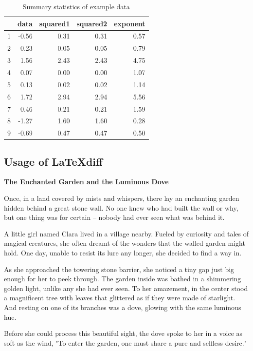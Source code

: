 \documentclass[10pt, fullpage, a4paper, titlepage]{article}
\begin{document}
\begin{table}[ht]
\centering
\caption{Summary statistics of example data}
\label{tab:example}
\begin{tabular}{rrrrr}
  \hline
 & data & squared1 & squared2 & exponent \\ 
  \hline
1 & -0.56 & 0.31 & 0.31 & 0.57 \\ 
2 & -0.23 & 0.05 & 0.05 & 0.79 \\ 
3 & 1.56 & 2.43 & 2.43 & 4.75 \\ 
4 & 0.07 & 0.00 & 0.00 & 1.07 \\ 
5 & 0.13 & 0.02 & 0.02 & 1.14 \\ 
6 & 1.72 & 2.94 & 2.94 & 5.56 \\ 
7 & 0.46 & 0.21 & 0.21 & 1.59 \\ 
8 & -1.27 & 1.60 & 1.60 & 0.28 \\ 
9 & -0.69 & 0.47 & 0.47 & 0.50 \\ 
   \hline
\end{tabular}
\end{table}

\subsection{Usage of LaTeXdiff}

\textbf{The Enchanted Garden and the Luminous Dove}

Once, in a land covered by mists and whispers, there lay an enchanting garden hidden behind a great stone wall. No one knew who had built the wall or why, but one thing was for certain – nobody had ever seen what was behind it.

A little girl named Clara lived in a village nearby. Fueled by curiosity and tales of magical creatures, she often dreamt of the wonders that the walled garden might hold. One day, unable to resist its lure any longer, she decided to find a way in.

As she approached the towering stone barrier, she noticed a tiny gap just big enough for her to peek through. The garden inside was bathed in a shimmering golden light, unlike any she had ever seen. To her amazement, in the center stood a magnificent tree with leaves that glittered as if they were made of starlight. And resting on one of its branches was a dove, glowing with the same luminous hue.

Before she could process this beautiful sight, the dove spoke to her in a voice as soft as the wind, "To enter the garden, one must share a pure and selfless desire."
\end{document}
